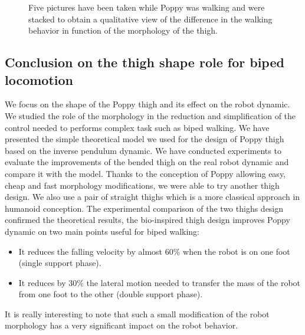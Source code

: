 \begin{figure}[h]
\centering
    \hfil
    \caption{Five pictures have been taken while Poppy was walking and were stacked to obtain a qualitative view of the difference in the walking behavior in function of the morphology of the thigh.}
    \label{fig:poppy_walking_compared}
\end{figure}


\subsection{Conclusion on the thigh shape role for biped locomotion} %
We focus on the shape of the Poppy thigh and its effect on the robot dynamic. We studied the role of the morphology in the reduction and simplification of the control needed to performs complex task such as biped walking. We have presented the simple theoretical model we used for the design of Poppy thigh based on the inverse pendulum dynamic. We have conducted experiments to evaluate the improvements of the bended thigh on the real robot dynamic and compare it with the model. Thanks to the conception of Poppy allowing easy, cheap and fast morphology modifications, we were able to try another thigh design. We also use a pair of straight thighs which is a more classical approach in humanoid conception. The experimental comparison of the two thighs design confirmed the theoretical results, the bio-inspired thigh design improves Poppy dynamic on two main points useful for biped walking:
\begin{itemize}
    \item It reduces the falling velocity by almost 60\% when the robot is on one foot (single support phase).
    \item It reduces by 30\% the lateral motion needed to transfer the mass of the robot from one foot to the other (double support phase).
\end{itemize}
It is really interesting to note that such a small modification of the robot morphology has a very significant impact on the robot behavior.

